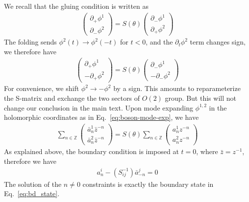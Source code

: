 We recall that the gluing condition is written as
\begin{equation}
\begin{aligned}
\label{eq:def_S_in_app}
\begin{pmatrix}
\partial_+\phi^1\\
\partial_-\phi^2
\end{pmatrix}
=S(\theta)
\begin{pmatrix}
\partial_-\phi^1\\
\partial_+\phi^2
\end{pmatrix}
\end{aligned}
\end{equation}
The folding sends $\phi^2(t)\rightarrow\phi^2(-t)$ for $t<0$, and the $\partial_t \phi^2$ term changes sign, we therefore have 
\begin{equation}
\begin{aligned}
\label{eq:def_S_in_app_2}
\begin{pmatrix}
\partial_+\phi^1\\
-\partial_+\phi^2
\end{pmatrix}
=S(\theta)
\begin{pmatrix}
\partial_-\phi^1\\
-\partial_-\phi^2
\end{pmatrix}
\end{aligned}
\end{equation}
For convenience, we shift $\phi^2\rightarrow-\phi^2$ by a sign. This amounts to reparameterize the S-matrix and exchange the two sectors of $O(2)$ group. But this will not change our conclusion in the main text. 
Upon mode expanding $\phi^{1,2}$ in the holomorphic coordinates as in Eq.~\eqref{eq:boson-mode-exp}, we have
\begin{equation}
\begin{aligned}
\label{eq:def_S_in_app_2}
\sum_{n\in\mathbb{Z}}
\begin{pmatrix}
\bar{a}_n^1\bar{z}^{-n}\\
\bar{a}_n^2\bar{z}^{-n}
\end{pmatrix}
=S(\theta)
\sum_{n\in\mathbb{Z}}
\begin{pmatrix}
a_n^1{z}^{-n}\\
a_n^2{z}^{-n}
\end{pmatrix}
\end{aligned}
\end{equation}
As explained above, the boundary condition is imposed at $t=0$, where $\bar{z}=z^{-1}$, therefore we have
\begin{equation}\begin{aligned}
a^i_n-(S^{-1}_{ij})\bar{a}^j_{-n}=0
\end{aligned}\end{equation}
The solution of the $n \ne 0$ constraints is exactly the boundary state in Eq.~\eqref{eq:bd_state}. 

